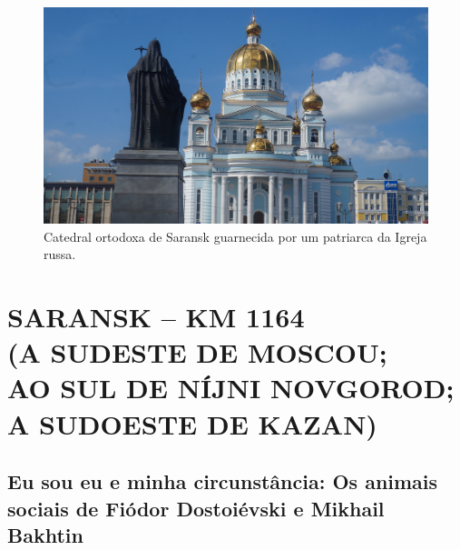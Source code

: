 \pagebreak
\clearpage
\thispagestyle{empty}

\begin{absolutelynopagebreak}
\begin{vplace}
\begin{figure}[H]
\begin{adjustwidth}{-2.7cm}{}
  \vspace{3cm}
  \hspace{0.3cm}
  \includegraphics[width=140mm]{./imgs/saransk1.jpg}  
\end{adjustwidth}
  \caption{Catedral ortodoxa de Saransk guarnecida por um patriarca da Igreja russa.}

\thispagestyle{empty}

\end{figure}
\end{vplace}

\end{absolutelynopagebreak}


\movetooddpage
{}
\part*{SARANSK -- KM 1164\\(A SUDESTE DE MOSCOU;\\AO SUL DE NÍJNI NOVGOROD;\\A SUDOESTE DE KAZAN)}

\chapter*{Eu sou eu e minha circunstância: Os animais sociais de Fiódor Dostoiévski e Mikhail Bakhtin}

